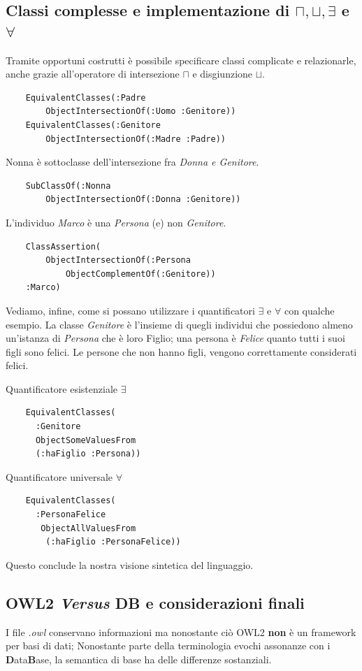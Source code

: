 \subsection{Classi complesse e implementazione di $ \sqcap,\sqcup,\exists $ e $ \forall $}
Tramite opportuni costrutti è possibile specificare classi complicate e relazionarle, 
anche grazie all'operatore di intersezione $\sqcap$ e disgiunzione $ \sqcup $.
\begin{verbatim}
	EquivalentClasses(:Padre
		ObjectIntersectionOf(:Uomo :Genitore))
	EquivalentClasses(:Genitore
		ObjectIntersectionOf(:Madre :Padre))
\end{verbatim}
Nonna è sottoclasse dell'intersezione fra \textit{Donna e Genitore}.
\begin{verbatim}
	SubClassOf(:Nonna 
		ObjectIntersectionOf(:Donna :Genitore))
\end{verbatim}
L'individuo \textit{Marco} è una \textit{Persona} (e) non \textit{Genitore}.
\begin{verbatim}
	ClassAssertion(
		ObjectIntersectionOf(:Persona 
			ObjectComplementOf(:Genitore))
	:Marco)
\end{verbatim}
Vediamo, infine, come si possano utilizzare i quantificatori $ \exists $ e $ \forall $ con qualche esempio.
La classe \textit{Genitore} è l'insieme di quegli individui che possiedono almeno un'istanza 
di \textit{Persona} che è loro Figlio; una persona è \textit{Felice} quanto tutti 
i suoi figli sono felici. Le persone che non hanno figli, vengono correttamente considerati felici.
\begin{multicols}{2}
	Quantificatore esistenziale $ \exists $
	\begin{verbatim}
	EquivalentClasses(
	  :Genitore
	  ObjectSomeValuesFrom
	  (:haFiglio :Persona))
	\end{verbatim}
	
	Quantificatore universale $ \forall $
	\begin{verbatim}
	EquivalentClasses(
	  :PersonaFelice
	   ObjectAllValuesFrom
	    (:haFiglio :PersonaFelice))
	\end{verbatim}
\end{multicols}

Questo conclude la nostra visione sintetica del linguaggio.

\subsection{OWL2 \emph{Versus} DB e considerazioni finali}
I file \textit{.owl} conservano informazioni ma nonostante ciò OWL2 \textbf{non} è un framework
per basi di dati; Nonostante parte della terminologia evochi assonanze con i \textbf{D}ata\textbf{B}ase, 
la semantica di base ha delle differenze sostanziali.

